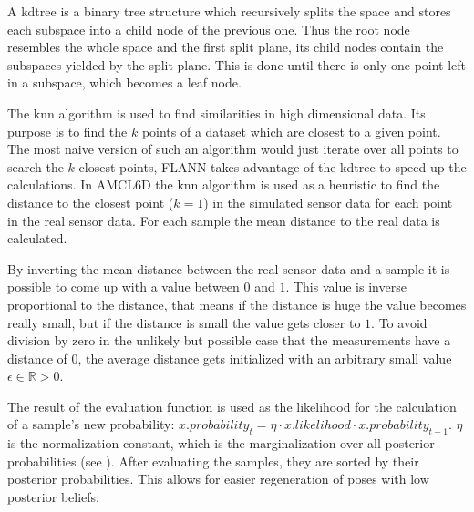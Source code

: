 \documentclass[Thesis.tex]{subfiles}
\begin{document}
A \gls{kdtree} is a binary tree structure which recursively splits the space and stores each subspace into a child node of the previous one. Thus the root node resembles the whole space and the first split plane, its child nodes contain the subspaces yielded by the split plane. This is done until there is only one point left in a subspace, which becomes a leaf node. 

The \gls{knn} algorithm is used to find similarities in high dimensional data\cite{flann_pami_2014}. Its purpose is to find the $k$ points of a dataset which are closest to a given point. The most naive version of such an algorithm would just iterate over all points to search the $k$ closest points, \gls{FLANN} takes advantage of the \gls{kdtree} to speed up the calculations. 
In \gls{AMCL6D} the \gls{knn} algorithm is used as a heuristic to find the distance to the closest point ($k=1$) in the simulated sensor data for each point in the real sensor data. For each sample the mean distance to the real data is calculated.

By inverting the mean distance between the real sensor data and a sample it is possible to come up with a value between $0$ and $1$. This value is inverse proportional to the distance, that means if the distance is huge the value becomes really small, but if the distance is small the value gets closer to $1$. To avoid division by zero in the unlikely but possible case that the measurements have a distance of $0$, the average distance gets initialized with an arbitrary small value $\epsilon \in \mathbb{R} > 0$.

The result of the evaluation function is used as the likelihood for the calculation of a sample's new probability: $x.probability_t = \eta \cdot x.likelihood \cdot x.probability_{t-1}$. $\eta$ is the normalization constant, which is the marginalization over all posterior probabilities (see ).
After evaluating the samples, they are sorted by their posterior probabilities. This allows for easier regeneration of poses with low posterior beliefs.
\end{document}
